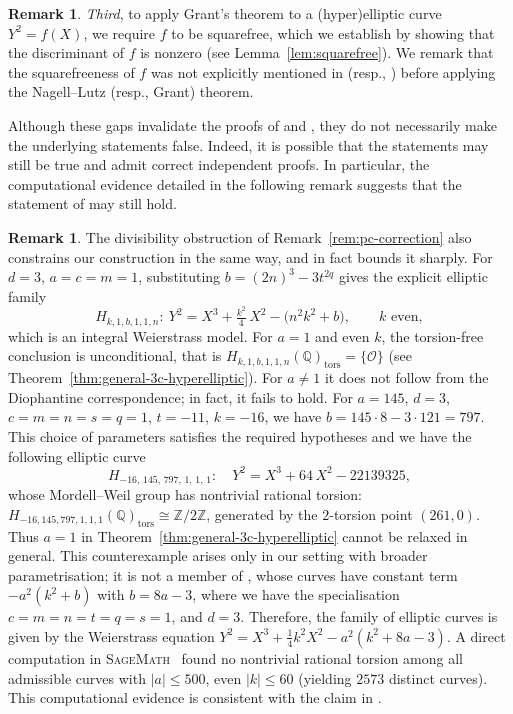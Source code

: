 \documentclass[11pt,a4paper]{amsart}
\newcommand{\ZZ}{\mathbb{Z}}
\newcommand{\Q}{\mathbb{Q}}
\theoremstyle{plain}
\theoremstyle{definition}
\newtheorem{remark}[theorem]{Remark}
\begin{document}
\begin{remark}
\textit{Third}, to apply Grant's theorem to a (hyper)elliptic curve $Y^2 = f(X)$, we require $f$ to be squarefree, which we establish by showing that the discriminant of $f$ is nonzero (see Lemma~\ref{lem:squarefree}). We remark that the squarefreeness of $f$ was not explicitly mentioned in \cite{VaishyaSharma} (resp., \cite{PrakashChakraborty}) before applying the Nagell--Lutz (resp., Grant) theorem.

Although these gaps invalidate the proofs of \cite[Theorem~1.2]{VaishyaSharma} and \cite[Theorem~3.3]{PrakashChakraborty}, they do not necessarily make the underlying statements false. Indeed, it is possible that the statements may still be true and admit correct independent proofs. In particular, the computational evidence detailed in the following remark suggests that the statement of \cite[Theorem~1.2]{VaishyaSharma} may still hold.
\end{remark}

\begin{remark}\label{rem:our-scope-and-counterexample}
The divisibility obstruction of Remark~\ref{rem:pc-correction} also constrains our construction in the same way, and in fact bounds it sharply. For $d = 3$, $a = c = m = 1$, substituting $b = (2n)^3 - 3t^{2q}$ gives the explicit elliptic family
\[
  H_{k,1,b,1,1,n}\colon\ Y^2 = X^3 + \tfrac{k^2}{4}\,X^2 - \bigl(n^2 k^2 + b\bigr),\qquad k \text{ even},
\]
which is an integral Weierstrass model. For $a = 1$ and even $k$, the torsion-free conclusion is unconditional, that is $H_{k,1,b,1,1,n}(\Q)_{\mathrm{tors}} = \{\mathcal{O}\}$ (see Theorem~\ref{thm:general-3c-hyperelliptic}). For $a \neq 1$ it does not follow from the Diophantine correspondence; in fact, it fails to hold. For $a = 145$, $d = 3$, $c = m = n = s = q = 1$, $t = -11$, $k = -16$, we have $b = 145\cdot 8 - 3\cdot 121 = 797$. This choice of parameters satisfies the required hypotheses and we have the following elliptic curve
\[
  H_{-16,\,145,\,797,\,1,\,1,\,1}\colon\quad Y^2 = X^3 + 64\,X^2 - 22139325,
\]
whose Mordell--Weil group has nontrivial rational torsion: $H_{-16,145,797,1,1,1}(\Q)_{\mathrm{tors}} \cong \ZZ/2\ZZ$, generated by the $2$-torsion point $(261, 0)$. Thus $a = 1$ in Theorem~\ref{thm:general-3c-hyperelliptic} cannot be relaxed in general. This counterexample arises only in our setting with broader parametrisation; it is not a member of \cite{VaishyaSharma}, whose curves have constant term $-a^2(k^2 + b)$ with $b = 8a - 3$, where we have the specialisation $c = m = n = t = q = s = 1$, and $d=3$. Therefore, the family of elliptic curves is given by the Weierstrass equation $Y^2 = X^3 + \frac{1}{4} k^2 X^2 - a^2(k^2 + 8a - 3)$. A direct computation in \textsc{SageMath}~\cite{sagemath} found no nontrivial rational torsion among all admissible curves with $|a| \le 500$, even $|k| \le 60$ (yielding $2573$ distinct curves). This computational evidence is consistent with the claim in \cite[Theorem~1.2 (1)]{VaishyaSharma}.
\end{remark}
\end{document}
